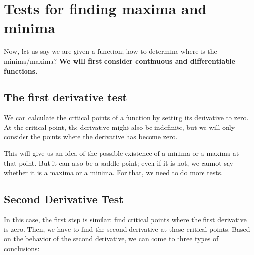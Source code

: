 \section{Tests for finding maxima and minima}

Now, let us say we are given a function; how to determine where is the minima/maxima? \textbf{We will first consider continuous and differentiable functions.}

\subsection{The first derivative test}

We can calculate the critical points of a function by setting its derivative to zero.  At the critical point, the derivative might also be indefinite, but we will only consider the points where the derivative has become zero. 

This will give us an idea of the possible existence of a minima or a maxima at that point. But it can also be a saddle point; even if it is not, we cannot say whether it is a maxima or a minima. For that, we need to do more tests.

\subsection{Second Derivative Test}

In this case, the first step is similar: find critical points where the first derivative is zero. Then, we have to find the second derivative at these critical points. 
Based on the behavior of the second derivative, we can come to three types of conclusions:

